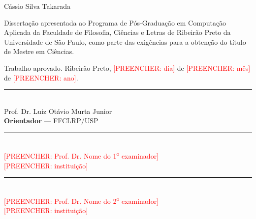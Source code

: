 
\begin{folhadeaprovacao}
\begin{center}
  {\ABNTEXchapterfont\large Cássio Silva Takarada}

  \vspace*{\fill}
  {\ABNTEXchapterfont\bfseries\Large \imprimirtitulo}
  \vspace*{\fill}
\end{center}

\hspace{.45\textwidth}
\begin{minipage}{.5\textwidth}
  \SingleSpacing
  Dissertação apresentada ao Programa de Pós-Graduação em Computação
  Aplicada da Faculdade de Filosofia, Ciências e Letras de Ribeirão Preto
  da Universidade de São Paulo, como parte das exigências para a obtenção
  do título de Mestre em Ciências.
\end{minipage}

\vspace{1.5cm}
\begin{center}
  Trabalho aprovado. Ribeirão Preto,
  \textcolor{red}{[PREENCHER: dia]} de
  \textcolor{red}{[PREENCHER: mês]} de \textcolor{red}{[PREENCHER: ano]}.
\end{center}

\vspace{1.5cm}
\begin{center}
  \rule{10cm}{0.4pt}\\
  Prof. Dr. Luiz Otávio Murta Junior\\
  \textbf{Orientador} --- FFCLRP/USP

  \vspace{1.2cm}
  \rule{10cm}{0.4pt}\\
  \textcolor{red}{[PREENCHER: Prof. Dr. Nome do 1\textsuperscript{o} examinador]}\\
  \textcolor{red}{[PREENCHER: instituição]}

  \vspace{1.2cm}
  \rule{10cm}{0.4pt}\\
  \textcolor{red}{[PREENCHER: Prof. Dr. Nome do 2\textsuperscript{o} examinador]}\\
  \textcolor{red}{[PREENCHER: instituição]}
\end{center}

\vspace*{\fill}
\end{folhadeaprovacao}
